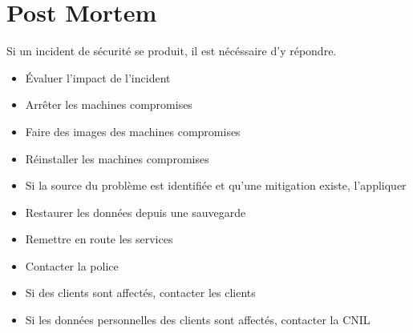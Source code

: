 \section{Post Mortem}

\begin{frame}

Si un incident de sécurité se produit, il est nécéssaire d'y répondre.
\begin{itemize}
    \item Évaluer l'impact de l'incident
    \item Arrêter les machines compromises
    \item Faire des images des machines compromises
    \item Réinstaller les machines compromises
    \item Si la source du problème est identifiée et qu'une mitigation existe, l'appliquer
    \item Restaurer les données depuis une sauvegarde
    \item Remettre en route les services
    \item Contacter la police
    \item Si des clients sont affectés, contacter les clients
    \item Si les données personnelles des clients sont affectés, contacter la CNIL
\end{itemize}

\end{frame}

